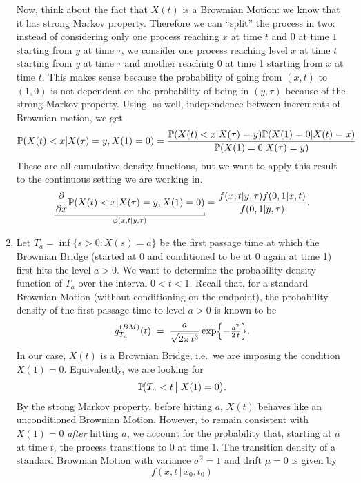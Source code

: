 \documentclass[12pt]{article}
\begin{document}
\begin{enumerate}
\begin{comment}
			\end{align*}
		\end{comment}
		Now, think about the fact that $X(t)$ is a Browmian Motion: we know that it has strong Markov property. Therefore we can ``split'' the process in two: instead of considering only one process reaching $x$ at time $t$ and $0$ at time $1$ starting from $y$ at time $\tau$, we consider one process reaching level $x$ at time $t$ starting from $y$ at time $\tau$ and another reaching 0 at time 1 starting from $x$ at time $t$. This makes sense because the probability of going from $(x,t)$ to $(1,0)$ is not dependent on the probability of being in $(y,\tau)$ because of the strong Markov property. Using, as well, independence between increments of Brownian motion, we get
		\begin{equation*}
			\mathbb{P}(X(t)<x|X(\tau)=y,X(1)=0)=\frac{\mathbb{P}(X(t)<x|X(\tau)=y)\mathbb{P}(X(1)=0|X(t)=x)}{\mathbb{P}(X(1)=0|X(\tau)=y)}
		\end{equation*}
		These are all cumulative density functions, but we want to apply this result to the continuous setting we are working in.
		\begin{equation*}
			\ubracketthin{\frac{\partial}{\partial x}\pr(X(t)<x|X(\tau)=y,X(1)=0)}_{\varphi(x,t|y,\tau)}=\frac{f(x,t|y,\tau)f(0,1|x,t)}{f(0,1|y,\tau)}.
		\end{equation*}
		\item
		Let $T_a = \inf\{ s>0 : X(s) = a\}$ be the {first passage time} at which the Brownian Bridge (started at 0 and conditioned to be at 0 again at time 1) first hits the level $a > 0$. We want to determine the probability density function of $T_a$ over the interval $0 < t < 1$.
		Recall that, for a {standard Brownian Motion} (without conditioning on the endpoint), the probability density of the first passage time to level $a>0$ is known to be
		\[
		g_{T_a}^{(BM)}(t)
		\;=\;
		\frac{a}{\sqrt{2\pi\,t^{3}}}
		\exp\Bigl\{-\tfrac{a^{2}}{2\,t}\Bigr\}.
		\]
		In our case, $X(t)$ is a Brownian Bridge, i.e.\ we are imposing the condition $X(1)=0$. Equivalently, we are looking for
		\[
		\mathbb{P}\!\bigl(T_a < t \,\big|\; X(1)=0\bigr).
		\]
		By the strong Markov property, before hitting $a$, $X(t)$ behaves like an unconditioned Brownian Motion. However, to remain consistent with $X(1)=0$ \textit{after} hitting $a$, we account for the probability that, starting at $a$ at time $t$, the process transitions to $0$ at time $1$. 
		The transition density of a standard Brownian Motion with variance $\sigma^2=1$ and drift $\mu=0$ is given by
		\[
		f(x,t \,|\, x_0,t_0)
\]
\end{enumerate}
\end{document}
